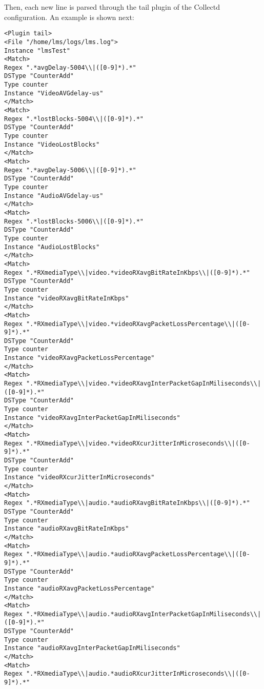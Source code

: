 Then, each new line is parsed through the tail plugin of the Collectd configuration. An example is shown next:
\begin{verbatim}
<Plugin tail>
<File "/home/lms/logs/lms.log">
Instance "lmsTest"
<Match>
Regex ".*avgDelay-5004\\|([0-9]*).*"
DSType "CounterAdd"
Type counter
Instance "VideoAVGdelay-us"
</Match>
<Match>
Regex ".*lostBlocks-5004\\|([0-9]*).*"
DSType "CounterAdd"
Type counter
Instance "VideoLostBlocks"
</Match>
<Match>
Regex ".*avgDelay-5006\\|([0-9]*).*"
DSType "CounterAdd"
Type counter
Instance "AudioAVGdelay-us"
</Match>
<Match>
Regex ".*lostBlocks-5006\\|([0-9]*).*"
DSType "CounterAdd"
Type counter
Instance "AudioLostBlocks"
</Match>
<Match>
Regex ".*RXmediaType\\|video.*videoRXavgBitRateInKbps\\|([0-9]*).*"
DSType "CounterAdd"
Type counter
Instance "videoRXavgBitRateInKbps"
</Match>
<Match>
Regex ".*RXmediaType\\|video.*videoRXavgPacketLossPercentage\\|([0-9]*).*"
DSType "CounterAdd"
Type counter
Instance "videoRXavgPacketLossPercentage"
</Match>
<Match>
Regex ".*RXmediaType\\|video.*videoRXavgInterPacketGapInMiliseconds\\|([0-9]*).*"
DSType "CounterAdd"
Type counter
Instance "videoRXavgInterPacketGapInMiliseconds"
</Match>
<Match>
Regex ".*RXmediaType\\|video.*videoRXcurJitterInMicroseconds\\|([0-9]*).*"
DSType "CounterAdd"
Type counter
Instance "videoRXcurJitterInMicroseconds"
</Match>
<Match>
Regex ".*RXmediaType\\|audio.*audioRXavgBitRateInKbps\\|([0-9]*).*"
DSType "CounterAdd"
Type counter
Instance "audioRXavgBitRateInKbps"
</Match>
<Match>
Regex ".*RXmediaType\\|audio.*audioRXavgPacketLossPercentage\\|([0-9]*).*"
DSType "CounterAdd"
Type counter
Instance "audioRXavgPacketLossPercentage"
</Match>
<Match>
Regex ".*RXmediaType\\|audio.*audioRXavgInterPacketGapInMiliseconds\\|([0-9]*).*"
DSType "CounterAdd"
Type counter
Instance "audioRXavgInterPacketGapInMiliseconds"
</Match>
<Match>
Regex ".*RXmediaType\\|audio.*audioRXcurJitterInMicroseconds\\|([0-9]*).*"

\end{verbatim}
